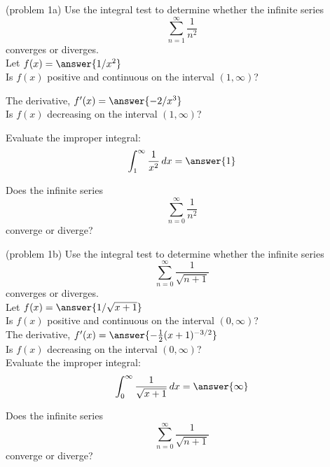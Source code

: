\documentclass{ximera}
\begin{document}
\begin{problem}(problem 1a)
Use the integral test to determine whether the infinite series
\[
\sum_{n=1}^\infty \frac{1}{n^2}
\]
converges or diverges.\\

Let $f(x) = \answer{ 1/x^2 }$\\

Is $f(x)$ positive and continuous on the interval $(1, \infty)$? 


The derivative, $f'(x) = \answer{-2/x^3}$\\

Is $f(x)$ decreasing on the interval $(1, \infty)$? 


Evaluate the improper integral: 
\[
 \int_1^\infty \frac{1}{x^2} \, dx = \answer{1}
\]

Does the infinite series
\[
\sum_{n=0}^\infty  \frac{1}{n^2}
\]
converge or diverge? 


\end{problem}



\begin{problem}(problem 1b)
Use the integral test to determine whether the infinite series
\[
\sum_{n=0}^\infty \frac{1}{\sqrt{n+1}}
\]
converges or diverges.\\

Let $f(x) = \answer{ 1/\sqrt{x+1} }$\\

Is $f(x)$ positive and continuous on the interval $(0, \infty)$?\\


The derivative, $f'(x) = \answer{-\frac12 (x+1)^{-3/2}}$\\

Is $f(x)$ decreasing on the interval $(0, \infty)$? \\


Evaluate the improper integral: 
\[
 \int_0^\infty \frac{1}{\sqrt{x+1}} \, dx = \answer{\infty}
\]

Does the infinite series
\[
\sum_{n=0}^\infty \frac{1}{\sqrt{n+1}}
\]
converge or diverge?


\end{problem}
\end{document}
